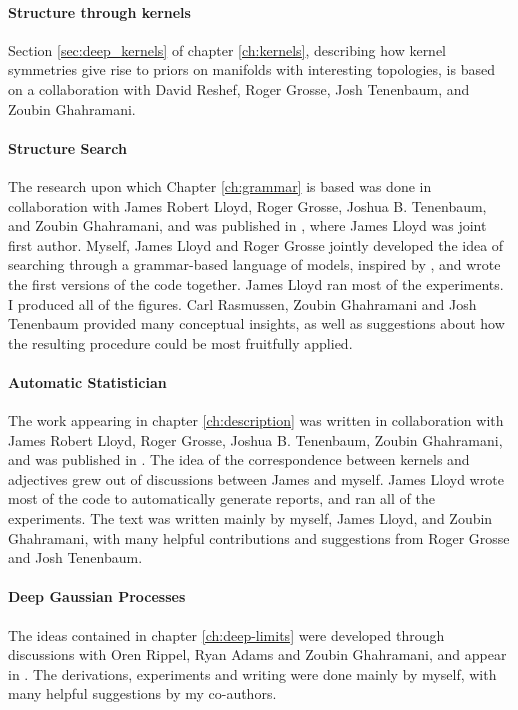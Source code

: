 \paragraph{Structure through kernels}
Section \ref{sec:deep_kernels} of chapter \ref{ch:kernels}, describing how kernel symmetries give rise to priors on manifolds with interesting topologies, is based on a collaboration with David Reshef, Roger Grosse, Josh Tenenbaum, and Zoubin Ghahramani.

\paragraph{Structure Search}
The research upon which Chapter \ref{ch:grammar} is based was done in collaboration with James Robert Lloyd, Roger Grosse, Joshua B. Tenenbaum, and Zoubin Ghahramani, and was published in \citep{DuvLloGroetal13}, where James Lloyd was joint first author.
Myself, James Lloyd and Roger Grosse jointly developed the idea of searching through a grammar-based language of \gp{} models, inspired by \citet{grosse2012exploiting}, and wrote the first versions of the code together.
James Lloyd ran most of the experiments.
I produced all of the figures.
Carl Rasmussen, Zoubin Ghahramani and Josh Tenenbaum provided many conceptual insights, as well as suggestions about how the resulting procedure could be most fruitfully applied.

\paragraph{Automatic Statistician} The work appearing in chapter \ref{ch:description} was written in collaboration with James Robert Lloyd, Roger Grosse, Joshua B. Tenenbaum, Zoubin Ghahramani, and was published in \citep{LloDuvGroetal14}.
The idea of the correspondence between kernels and adjectives grew out of discussions between James and myself.
James Lloyd wrote most of the code to automatically generate reports, and ran all of the experiments.
The text was written mainly by myself, James Lloyd, and Zoubin Ghahramani, with many helpful contributions and suggestions from Roger Grosse and Josh Tenenbaum.

\paragraph{Deep Gaussian Processes}
The ideas contained in chapter \ref{ch:deep-limits} were developed through discussions with Oren Rippel, Ryan Adams and Zoubin Ghahramani, and appear in \citep{DuvRipAdaGha14}.  The derivations, experiments and writing were done mainly by myself, with many helpful suggestions by my co-authors.

